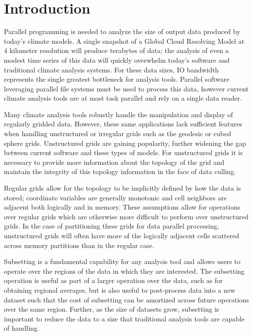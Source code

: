 \section{Introduction}
\label{section:introduction}

Parallel programming is needed to analyze the size of output data produced by
today's climate models\cite{MODSIM07:LOT}.  A single snapshot of a Global
Cloud Resolving Model at 4 kilometer resolution will produce terabytes of
data\cite{GCRM}; the analysis of even a modest time series of this data will
quickly overwhelm today's software and traditional climate analysis systems.
For these data sizes, IO bandwidth represents the single greatest bottleneck
for analysis tools.  Parallel software leveraging parallel file systems must
be used to process this data, however current climate analysis tools are at
most task parallel and rely on a single data reader\cite{CDAT,CDO,NCO}.

Many climate analysis tools robustly handle the manipulation and display of
regularly gridded data.  However, these same applications lack sufficient
features when handling unstructured or irregular grids such as the
geodesic\cite{GEODESIC} or cubed sphere\cite{CUBE} grids.  Unstructured grids
are gaining popularity, further widening the gap between current software and
these types of models.  For unstructured grids it is necessary to provide more
information about the topology of the grid and maintain the integrity of this
topology information in the face of data culling.

Regular grids allow for the topology to be implicitly defined by how
the data is stored; coordinate variables are generally monotonic and cell
neighbors are adjacent both logically and in memory.  These assumptions allow
for operations over regular grids which are otherwise more difficult to
perform over unstructured grids.  In the case of partitioning these grids for
data parallel processing, unstructured grids will often have more of the
logically adjacent cells scattered across memory partitions than in the
regular case.

Subsetting is a fundamental capability for any analysis tool and allows users
to operate over the regions of the data in which they are interested.  The
subsetting operation is useful as part of a larger operation over the data,
such as for obtaining regional averages, but is also useful to post-process
data into a new dataset such that the cost of subsetting can be amortized
across future operations over the same region.  Further, as the size of
datasets grow, subsetting is important to reduce the data to a size that
traditional analysis tools are capable of handling. 


